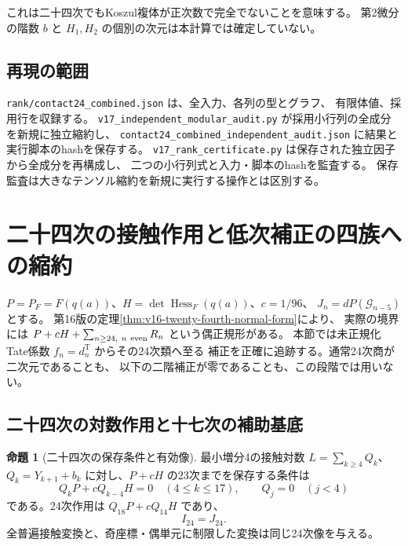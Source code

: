 \documentclass[a4paper,11pt]{ltjsarticle}
\theoremstyle{definition}
\newtheorem{proposition}[theorem]{命題}
\begin{document}
これは二十四次でもKoszul複体が正次数で完全でないことを意味する。
第2微分の階数 $b$ と $H_1,H_2$ の個別の次元は本計算では確定していない。

\subsection{再現の範囲}

\texttt{rank/contact24\_combined.json} は、全入力、各列の型とグラフ、
有限体値、採用行を収録する。
\texttt{v17\_independent\_modular\_audit.py} が採用小行列の全成分を新規に独立縮約し、
\texttt{contact24\_combined\_independent\_audit.json} に結果と実行脚本のhashを保存する。
\texttt{v17\_rank\_certificate.py} は保存された独立因子から全成分を再構成し、
二つの小行列式と入力・脚本のhashを監査する。
保存監査は大きなテンソル縮約を新規に実行する操作とは区別する。




\section{二十四次の接触作用と低次補正の四族への縮約}
\label{sec:v17-contact-twenty-fourth}

$P=P_F=F(q(a))$、$H=\det\operatorname{Hess}_F(q(a))$、$c=1/96$、
$J_n=dP(\mathcal G_{n-5})$ とする。
第16版の定理\ref{thm:v16-twenty-fourth-normal-form}により、
実際の境界には $P+cH+\sum_{n\ge24,\ n\ {\rm even}}R_n$ という偶正規形がある。
本節では未正規化Tate係数 $f_n=d_n^{\mathrm T}$ からその24次類へ至る
補正を正確に追跡する。通常24次商が二次元であることも、
以下の二階補正が零であることも、この段階では用いない。

\subsection{二十四次の対数作用と十七次の補助基底}

\begin{proposition}[二十四次の保存条件と有効像]
\label{prop:v17-effective-twenty-fourth}
最小増分4の接触対数 $L=\sum_{k\ge4}Q_k$、
$Q_k=Y_{k+1}+b_k$ に対し、$P+cH$ の23次までを保存する条件は
\begin{equation}\label{eq:v17-twenty-fourth-preservation}
 Q_kP+cQ_{k-4}H=0\quad(4\le k\le17),\qquad Q_j=0\quad(j<4)
\end{equation}
である。24次作用は $Q_{18}P+cQ_{14}H$ であり、
\[
                            I_{24}=J_{24}.
\]
全普遍接触変換と、奇座標・偶単元に制限した変換は同じ24次像を与える。
\end{proposition}
\end{document}

